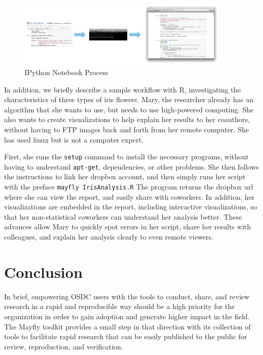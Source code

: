 \documentclass[10pt,a4]{article}
\begin{document}
\begin{figure}[htbp]
\begin{center}
\includegraphics[width=0.9\textwidth]{flow.pdf}
\caption{IPython Notebook Process}
\label{fig:ipythonProc}
\end{center}
\end{figure}

In addition, we briefly describe a sample workflow with R, investigating the characteristics of three types of iris flowers. Mary, the researcher already has an algorithm that she wants to use, but needs to use high-powered computing. She also wants to create visualizations to help explain her results to her coauthors, without having to FTP images back and forth from her remote computer. She has used linux but is not a computer expert.

First, she runs the \texttt{setup} command to install the necessary programs, without having to understand \texttt{apt-get}, dependencies, or other problems. She then follows the instructions to link her dropbox account, and then simply runs her script with the preface \texttt{mayfly IrisAnalysis.R}  The program returns the dropbox url where she can view the report, and easily share with coworkers. In addition, her visualizations are embedded in the report, including interactive visualizations, so that her non-statistical coworkers can understand her analysis better. These advances allow Mary to quickly spot errors in her script, share her results with colleagues, and explain her analysis clearly to even remote viewers. 

\section{Conclusion}

In brief, empowering OSDC users with the tools to conduct, share, and review research in a rapid and reproducible way should be a high priority for the organization in order to gain adoption and generate higher impact in the field.
The Mayfly toolkit provides a small step in that direction with its collection of tools to facilitate rapid research that can be easily published to the public for review, reproduction, and verification.
\end{document}
